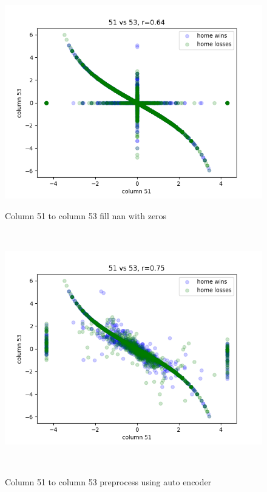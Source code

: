 \documentclass[10pt,a4paper]{article}
\begin{document}
\begin{figure}[ht]
    \centering
    \begin{minipage}{.2\textwidth}
        \centering
        \includegraphics[width=0.8\linewidth]{images/0.64r_51_to_53.png}
        \caption[width=0.8\linewidth]{Column 51 to column 53 fill nan with zeros}
        \label{fig:51-53}
    \end{minipage}%
    \begin{minipage}{.05\textwidth}
        \ 
    \end{minipage}%
    \begin{minipage}{.2\textwidth}
        \centering
        \includegraphics[width=0.8\linewidth]{images/0.75r_51_to_53_recovered.png}
        \caption[width=0.8\linewidth]{Column 51 to column 53 preprocess using auto encoder}
        \label{fig:51-53r}
    \end{minipage}%
    \begin{minipage}{.05\textwidth}
        \ 
    \end{minipage}%
    \begin{minipage}{.2\textwidth}

\end{minipage}
\end{figure}
\end{document}
